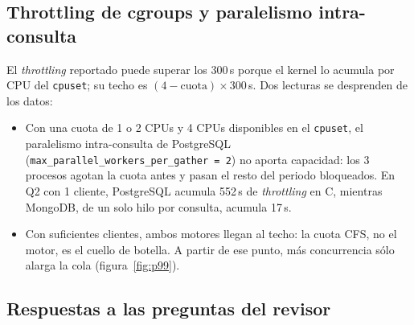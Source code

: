 \documentclass[11pt,a4paper]{article}
\begin{document}
\subsection{Throttling de cgroups y paralelismo intra-consulta}\label{sec:throttling}

El \emph{throttling} reportado puede superar los 300\,s porque el kernel lo acumula por CPU del \texttt{cpuset}; su techo es $(4-\text{cuota})\times300$\,s. Dos lecturas se desprenden de los datos:
\begin{itemize}
  \item Con una cuota de 1 o 2 CPUs y 4 CPUs disponibles en el \texttt{cpuset}, el paralelismo intra-consulta de PostgreSQL (\texttt{max\_parallel\_workers\_per\_gather = 2}) no aporta capacidad: los 3 procesos agotan la cuota antes y pasan el resto del periodo bloqueados. En Q2 con 1 cliente, PostgreSQL acumula 552\,s de \emph{throttling} en C, mientras MongoDB, de un solo hilo por consulta, acumula 17\,s.
  \item Con suficientes clientes, ambos motores llegan al techo: la cuota CFS, no el motor, es el cuello de botella. A partir de ese punto, más concurrencia sólo alarga la cola (figura~\ref{fig:p99}).
\end{itemize}

\subsection{Respuestas a las preguntas del revisor}
\end{document}
